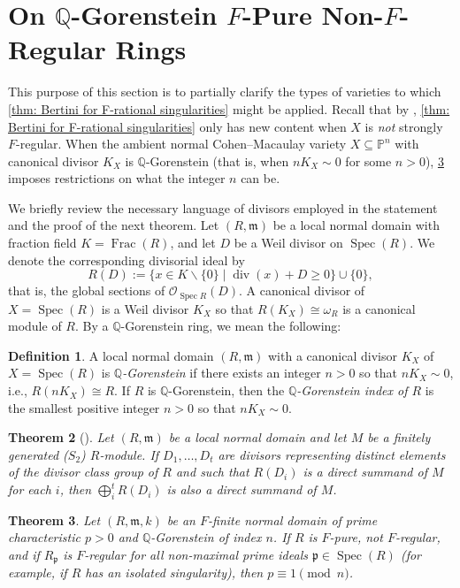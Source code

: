 \documentclass[reqno,11pt]{amsart}
\numberwithin{equation}{section}
\newtheorem{theorem}{Theorem}[section]
\theoremstyle{definition}
\theoremstyle{definition}
\theoremstyle{definition}
\newtheorem{definition}[theorem]{Definition}
\theoremstyle{remark}
\newcommand{\Spec}{\operatorname{Spec}}
\newcommand{\Div}{\operatorname{div}}
\newcommand{\Frac}{\operatorname{Frac}}
\newcommand{\Q}{\mathbb{Q}}
\newcommand{\PP}{\mathbb{P}}
\newcommand{\fm}{\mathfrak{m}}
\newcommand{\fp}{\mathfrak{p}}
\newcommand{\cO}{\mathcal{O}}
\begin{document}
\section{On \texorpdfstring{$\Q$}{Q}-Gorenstein \texorpdfstring{$F$}{F}-Pure Non-\texorpdfstring{$F$}{F}-Regular Rings}
This purpose of this section is to partially clarify the types of varieties to which \cref{thm: Bertini for F-rational singularities} might be applied. Recall that by \cite{SZ13}, \cref{thm: Bertini for F-rational singularities} only has new content when $X$ is \emph{not} strongly $F$-regular. When the ambient normal Cohen--Macaulay variety $X\subseteq\PP^n$ with canonical divisor $K_X$ is $\Q$-Gorenstein (that is, when $nK_X\sim 0$ for some $n>0$), \cref{prop: char cong to 1 mod p} imposes restrictions on what the integer $n$ can be.

We briefly review the necessary language of divisors employed in the statement and the proof of the next theorem. Let $(R,\fm)$ be a local normal domain with fraction field $K=\Frac(R)$, and let $D$ be a Weil divisor on $\Spec(R)$. We denote the corresponding divisorial ideal by $$R(D):=\{x\in K\smallsetminus\{0\}\mid \Div(x)+D\geq 0\}\cup\{0\},$$ that is, the global sections of $\cO_{\Spec R}(D)$. A canonical divisor of $X=\Spec(R)$ is a Weil divisor $K_X$ so that $R(K_X)\cong \omega_R$ is a canonical module of $R$. By a $\Q$-Gorenstein ring, we mean the following:
\begin{definition}
    A local normal domain $(R,\fm)$ with a canonical divisor $K_X$ of $X=\Spec(R)$ is \emph{$\Q$-Gorenstein} if there exists an integer $n>0$ so that $nK_X \sim 0$, i.e., $R(nK_X)\cong R$. If $R$ is $\Q$-Gorenstein, then the \emph{$\Q$-Gorenstein index of $R$} is the smallest positive integer $n>0$ so that $nK_X\sim 0$.
\end{definition}


\begin{theorem}[{\cite[Corollary 2.2]{Pol22}}] Let $(R,\fm)$ be a local normal domain and let $M$ be a finitely generated ($S_2$) $R$-module. If $D_1,\ldots, D_t$ are divisors representing distinct elements of the divisor class group of $R$ and such that $R(D_i)$ is a direct summand of $M$ for each $i$, then $\bigoplus\limits_{i}^t R(D_i)$ is also a direct summand of $M$.\label{thm:direct sums}
\end{theorem}

\begin{theorem}
    \label{prop: char cong to 1 mod p}
    Let $(R,\fm,k)$ be an $F$-finite normal domain of prime characteristic $p>0$ and $\mathbb{Q}$-Gorenstein of index $n$. If $R$ is $F$-pure, not $F$-regular, and if $R_{\fp}$ is $F$-regular for all non-maximal prime ideals $\fp\in\Spec(R)$ (for example, if $R$ has an isolated singularity), then $p\equiv 1\pmod{n}$.
\end{theorem}
\end{document}
